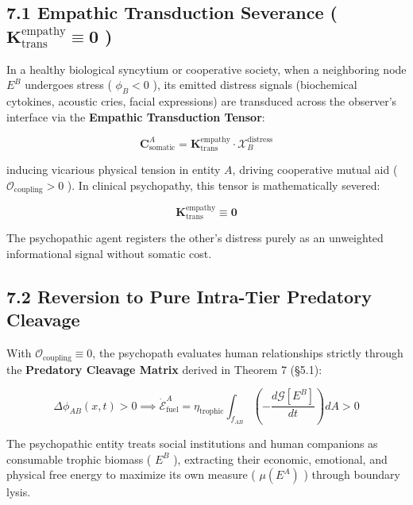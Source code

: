 \documentclass[11pt,a4paper]{article}
\theoremstyle{definition}
\theoremstyle{remark}
\begin{document}
\subsection{7.1 Empathic Transduction Severance ( $\mathbf{K}_{\text{trans}}^{\text{empathy}} \equiv \mathbf{0}$ )}
In a healthy biological syncytium or cooperative society, when a neighboring node $E^B$ undergoes stress ( $\phi_B < 0$ ), its emitted distress signals (biochemical cytokines, acoustic cries, facial expressions) are transduced across the observer's interface via the \textbf{Empathic Transduction Tensor}:


\begin{equation}
\mathbf{C}_{\text{somatic}}^A = \mathbf{K}_{\text{trans}}^{\text{empathy}} \cdot \boldsymbol{\mathcal{X}}_B^{\text{distress}}
\end{equation}


inducing vicarious physical tension in entity $A$, driving cooperative mutual aid ( $\mathcal{O}_{\text{coupling}} > 0$ ). In clinical psychopathy, this tensor is mathematically severed:


\begin{equation}
\mathbf{K}_{\text{trans}}^{\text{empathy}} \equiv \mathbf{0}
\end{equation}


The psychopathic agent registers the other's distress purely as an unweighted informational signal without somatic cost.

\subsection{7.2 Reversion to Pure Intra-Tier Predatory Cleavage}
With $\mathcal{O}_{\text{coupling}} \equiv 0$, the psychopath evaluates human relationships strictly through the \textbf{Predatory Cleavage Matrix} derived in Theorem 7 (\S 5.1):


\begin{equation}
\Delta \phi_{AB}(x, t) > 0 \implies \dot{\mathcal{E}}_{\text{fuel}}^A = \eta_{\text{trophic}} \int_{f_{AB}} \left( -\frac{d\mathcal{G}[E^B]}{dt} \right) dA > 0
\end{equation}


The psychopathic entity treats social institutions and human companions as consumable trophic biomass ( $E^B$ ), extracting their economic, emotional, and physical free energy to maximize its own measure ( $\mu(E^A)$ ) through boundary lysis.
\end{document}
